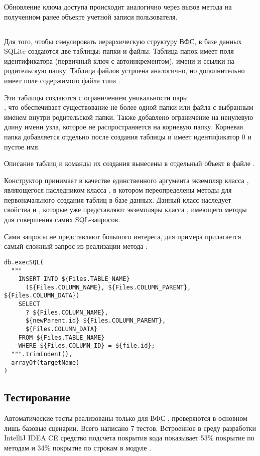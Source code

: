     Обновление ключа доступа происходит аналогично через вызов метода  на полученном ранее объекте  учетной записи пользователя.

\subsection{}
  Для того, чтобы сэмулировать иерархическую структуру ВФС, в базе данных SQLite создаются две таблицы: папки и файлы. Таблица папок имеет поля идентификатора (первичный ключ с автоинкрементом), имени и ссылки на родительскую папку. Таблица файлов устроена аналогично, но дополнительно имеет поле содержимого файла типа . 

  Эти таблицы создаются с ограничением уникальности пары\\ , что обеспечивает существование не более одной папки или файла с выбранным именем внутри родительской папки.
  Также добавлено ограничение на ненулевую длину имени узла, которое не распространяется на корневую папку. Корневая папка добавляется отдельно после создания таблицы и имеет идентификатор $0$ и пустое имя.
  
  Описание таблиц и команды их создания вынесены в отдельный объект в файле .

  Конструктор  принимает в качестве единственного аргумента экземпляр класса , являющегося наследником класса , в котором переопределены методы для первоначального создания таблиц в базе данных. Данный класс наследует свойства  и , которые уже представляют экземпляры класса , имеющего методы для совершения самих SQL-запросов.

  Сами запросы не представляют большого интереса, для примера прилагается самый сложный запрос из реализации метода :
  \begin{verbatim}
db.execSQL(
  """
    INSERT INTO ${Files.TABLE_NAME} 
      (${Files.COLUMN_NAME}, ${Files.COLUMN_PARENT}, ${Files.COLUMN_DATA})
    SELECT 
      ? ${Files.COLUMN_NAME},
      ${newParent.id} ${Files.COLUMN_PARENT},
      ${Files.COLUMN_DATA}
    FROM ${Files.TABLE_NAME}
    WHERE ${Files.COLUMN_ID} = ${file.id};
  """.trimIndent(),
  arrayOf(targetName)
)    
  \end{verbatim}

\subsection{Тестирование}
  Автоматические тесты реализованы только для ВФС , проверяются в основном лишь базовые сценарии. Всего написано 7 тестов. Встроенное в среду разработки IntelliJ IDEA CE средство подсчета покрытия кода показывает 53\% покрытие по методам и 34\% покрытие по строкам в модуле .

